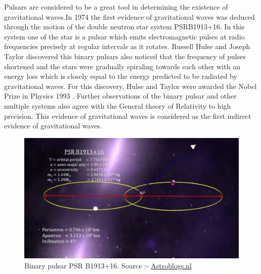 Pulsars are considered to be a great tool in determining the existence of gravitational waves.In 1974 \cite{Linear} the first evidence of gravitational waves was deduced through the motion of the double neutron star system PSRB1913+16. In this system one of the star is a pulsar which emits electromagnetic pulses at radio frequencies precisely at regular intervals as it rotates. Russell Hulse and Joseph Taylor discovered this binary pulsars also noticed that the frequency of pulses shortened and the stars were gradually spiraling towards each other with an energy loss which is closely equal to the energy predicted to be radiated by gravitational waves. For this discovery, Hulse and Taylor were awarded the Nobel Prize in Physics 1993 \cite{Lommen_2015}. Further observations of the binary pulsar and other multiple systems also agree with the General theory of Relativity to high precision. This evidence of gravitational waves is considered as the first indirect evidence of gravitational waves. 
 
\begin{figure}[h]
    \centering
    \includegraphics[scale=0.255]{images.tex/PSR-B191316.jpg}
    \caption{Binary pulsar PSR B1913+16. Source :- \href{https://www.astroblogs.nl/wp-content/uploads/2014/03/PSR-B191316.jpg}{Astroblogs.nl}}
\end{figure}

\pagebreak
